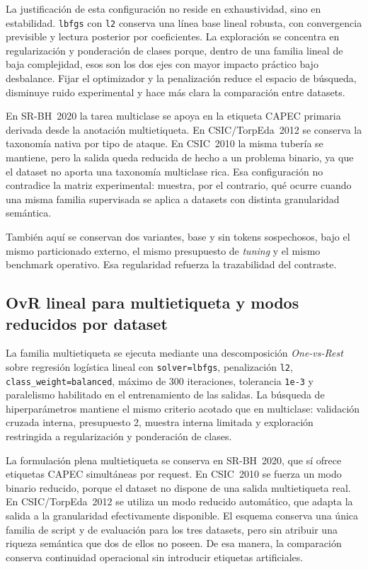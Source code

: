 \documentclass[12pt,oneside]{report}
\begin{document}
La justificación de esta configuración no reside en exhaustividad, sino en estabilidad. \texttt{lbfgs} con \texttt{l2} conserva una línea base lineal robusta, con convergencia previsible y lectura posterior por coeficientes. La exploración se concentra en regularización y ponderación de clases porque, dentro de una familia lineal de baja complejidad, esos son los dos ejes con mayor impacto práctico bajo desbalance. Fijar el optimizador y la penalización reduce el espacio de búsqueda, disminuye ruido experimental y hace más clara la comparación entre datasets.

En SR-BH~2020 la tarea multiclase se apoya en la etiqueta CAPEC primaria derivada desde la anotación multietiqueta. En CSIC/TorpEda~2012 se conserva la taxonomía nativa por tipo de ataque. En CSIC~2010 la misma tubería se mantiene, pero la salida queda reducida de hecho a un problema binario, ya que el dataset no aporta una taxonomía multiclase rica. Esa configuración no contradice la matriz experimental: muestra, por el contrario, qué ocurre cuando una misma familia supervisada se aplica a datasets con distinta granularidad semántica.

También aquí se conservan dos variantes, base y sin tokens sospechosos, bajo el mismo particionado externo, el mismo presupuesto de \textit{tuning} y el mismo benchmark operativo. Esa regularidad refuerza la trazabilidad del contraste.

\subsection{OvR lineal para multietiqueta y modos reducidos por dataset}
La familia multietiqueta se ejecuta mediante una descomposición \textit{One-vs-Rest} sobre regresión logística lineal con \texttt{solver=lbfgs}, penalización \texttt{l2}, \texttt{class\_weight=balanced}, máximo de 300 iteraciones, tolerancia \texttt{1e-3} y paralelismo habilitado en el entrenamiento de las salidas. La búsqueda de hiperparámetros mantiene el mismo criterio acotado que en multiclase: validación cruzada interna, presupuesto 2, muestra interna limitada y exploración restringida a regularización y ponderación de clases.

La formulación plena multietiqueta se conserva en SR-BH~2020, que sí ofrece etiquetas CAPEC simultáneas por request. En CSIC~2010 se fuerza un modo binario reducido, porque el dataset no dispone de una salida multietiqueta real. En CSIC/TorpEda~2012 se utiliza un modo reducido automático, que adapta la salida a la granularidad efectivamente disponible. El esquema conserva una única familia de script y de evaluación para los tres datasets, pero sin atribuir una riqueza semántica que dos de ellos no poseen. De esa manera, la comparación conserva continuidad operacional sin introducir etiquetas artificiales.
\end{document}

